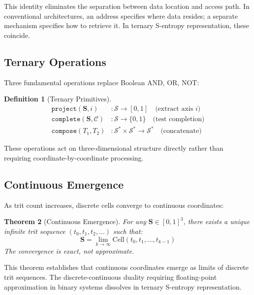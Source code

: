 \documentclass[10pt,twocolumn]{article}
\newtheorem{theorem}{Theorem}[section]
\theoremstyle{definition}
\newtheorem{definition}[theorem]{Definition}
\theoremstyle{remark}
\newcommand{\Scoord}{\mathbf{S}}
\newcommand{\Sspace}{\mathcal{S}}
\begin{document}
This identity eliminates the separation between data location and access path. In conventional architectures, an address specifies where data resides; a separate mechanism specifies how to retrieve it. In ternary S-entropy representation, these coincide.

\subsection{Ternary Operations}

Three fundamental operations replace Boolean AND, OR, NOT:

\begin{definition}[Ternary Primitives]
\begin{align}
\texttt{project}(\Scoord, i) &: \Sspace \to [0,1] \quad \text{(extract axis $i$)} \\
\texttt{complete}(\Scoord, \mathcal{C}) &: \Sspace \to \{0,1\} \quad \text{(test completion)} \\
\texttt{compose}(T_1, T_2) &: \Sspace^* \times \Sspace^* \to \Sspace^* \quad \text{(concatenate)}
\end{align}
\end{definition}

These operations act on three-dimensional structure directly rather than requiring coordinate-by-coordinate processing.

\subsection{Continuous Emergence}

As trit count increases, discrete cells converge to continuous coordinates:

\begin{theorem}[Continuous Emergence]
For any $\Scoord \in [0,1]^3$, there exists a unique infinite trit sequence $(t_0, t_1, t_2, \ldots)$ such that:
\begin{equation}
\Scoord = \lim_{k \to \infty} \text{Cell}(t_0, t_1, \ldots, t_{k-1})
\end{equation}
The convergence is exact, not approximate.
\end{theorem}

This theorem establishes that continuous coordinates emerge as limits of discrete trit sequences. The discrete-continuous duality requiring floating-point approximation in binary systems dissolves in ternary S-entropy representation.

\end{document}
